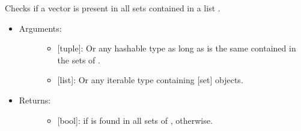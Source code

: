 \documentclass[letterpaper,10pt,english]{sphinxmanual}
\begin{document}
\begin{fulllineitems}
\label{\detokenize{sets:data_tools.sets.in_all}}
Checks if a vector  is present in all sets contained in a list
.
\begin{itemize}
\item {} \begin{description}
\item[{Arguments:}] \leavevmode\begin{itemize}
\item {} 
 {[}tuple{]}: Or any hashable type as long as is the same
contained in the sets of .

\item {} 
 {[}list{]}: Or any iterable type containing {[}set{]} objects.

\end{itemize}

\end{description}

\item {} \begin{description}
\item[{Returns:}] \leavevmode\begin{itemize}
\item {} 
{[}bool{]}:  if  is found in all sets of , 
otherwise.

\end{itemize}

\end{description}


\end{itemize}
\end{fulllineitems}
\end{document}

